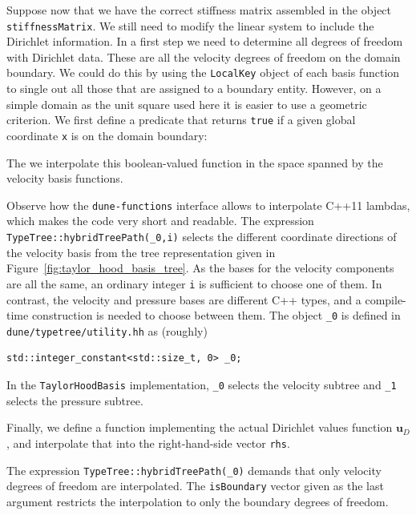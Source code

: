 \documentclass[a4paper,10pt,headings=normal,bibliography=totoc]{scrartcl}
\newcommand{\cpp}[1]{\lstinline[basicstyle=\ttfamily]!#1!}
\newcommand{\dunemodule}[1]{\texttt{#1}}
\newcommand{\file}[1]{\texttt{#1}}
\begin{document}
Suppose now that we have the correct stiffness matrix assembled in the object \cpp{stiffnessMatrix}.  We still need
to modify the linear system to include the Dirichlet information.
In a first step we need to determine all degrees of freedom with Dirichlet data.  These are all the velocity degrees of freedom
on the domain boundary.  We could do this by using the \cpp{LocalKey} object of each basis function
to single out all those that are assigned to a boundary entity.  However, on a simple domain as the unit square
used here it is easier to use a geometric criterion.  We first define a predicate that returns \cpp{true}
if a given global coordinate \cpp{x} is on the domain boundary:
%

%
The we interpolate this boolean-valued function in the space spanned by the velocity basis functions.
%

%
Observe how the \dunemodule{dune-functions} interface allows to interpolate C++11 lambdas, which makes the code
very short and readable.  The expression \cpp{TypeTree::hybridTreePath(_0,i)} selects the different coordinate
directions of the velocity basis from the tree representation given in Figure~\ref{fig:taylor_hood_basis_tree}.
As the bases for the velocity components are all the same, an ordinary integer \cpp{i} is sufficient to choose
one of them.  In contrast, the velocity and pressure bases are different C++ types, and a compile-time
construction is needed to choose between them.  The object \cpp{_0} is defined in
\file{dune/typetree/utility.hh} as (roughly)
\begin{lstlisting}
std::integer_constant<std::size_t, 0> _0;
\end{lstlisting}
In the \cpp{TaylorHoodBasis} implementation, \cpp{_0} selects the velocity subtree and \cpp{_1} selects
the pressure subtree.

Finally, we define a function implementing the actual Dirichlet values function $\mathbf{u}_D$, and interpolate
that into the right-hand-side vector \cpp{rhs}.
%

%
The expression \cpp{TypeTree::hybridTreePath(_0)} demands that only velocity degrees of freedom are
interpolated.  The \cpp{isBoundary} vector given as the last argument restricts the interpolation
to only the boundary degrees of freedom.
\end{document}
